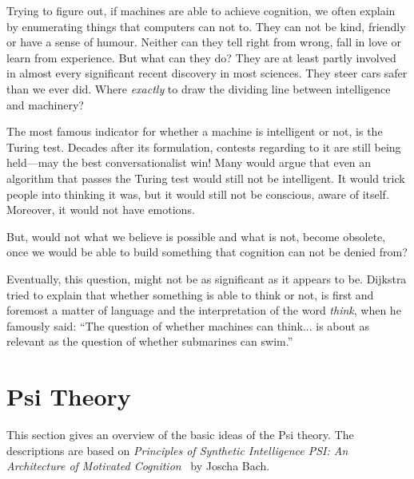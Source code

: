 
Trying to figure out, if machines are able to achieve cognition, we often explain by enumerating things that computers can not to. They can not be kind, friendly or have a sense of humour. Neither can they tell right from wrong, fall in love or learn from experience. But what can they do? They are at least partly involved in almost every significant recent discovery in most sciences. They steer cars safer than we ever did. Where \emph{exactly} to draw the dividing line between intelligence and machinery?~\cite{russell2009artificial}

The most famous indicator for whether a machine is intelligent or not, is the Turing test. Decades after its formulation, contests regarding to it are still being held---may the best conversationalist win! Many would argue that even an algorithm that passes the Turing test would still not be intelligent. It would trick people into thinking it was, but it would still not be conscious, aware of itself. Moreover, it would not have emotions.~\cite{russell2009artificial}

But, would not what we believe is possible and what is not, become obsolete, once we would be able to build something that cognition can not be denied from? 

Eventually, this question, might not be as significant as it appears to be. Dijkstra tried to explain that whether something is able to think or not, is first and foremost a matter of language and the interpretation of the word \emph{think}, when he famously said: ``The question of whether machines can think... is about as relevant as the question of whether submarines can swim.''

    \section{Psi Theory}
    
    

This section gives an overview of the basic ideas of the Psi theory. The descriptions are based on \emph{Principles of Synthetic Intelligence PSI: An Architecture of Motivated Cognition}~\cite{Bach:2009:PSI:1611304} by Joscha Bach.

